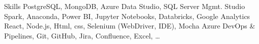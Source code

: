 
\begin{rubric}{Skills}
{}
	PostgreSQL, MongoDB, Azure Data Studio, SQL Server Mgmt. Studio
	Spark, Anaconda, Power BI, Jupyter Notebooks, Databricks, Google Analytics
	React, Node.js, Html, css, Selenium (WebDriver, IDE), Mocha
	Azure DevOps \& Pipelines, Git, GitHub, Jira, Confluence, Excel, \ldots
\end{rubric}
